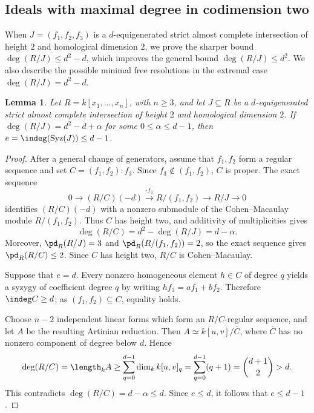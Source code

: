 \documentclass[11pt]{amsart} %
\newtheorem{Lemma}[Theorem]{Lemma}
\theoremstyle{definition}
\def\syz{\mbox{\rm Syz}}
\begin{document}
\subsection{Ideals with maximal degree in codimension two}
\label{subsec:ideals-max-degree}

When $J=(f_1,f_2,f_3)$ is a $d$-equigenerated strict almost complete intersection of height $2$ and homological dimension $2$, we prove the sharper bound $\deg(R/J)\le d^2-d$, which improves the general bound $\deg(R/J)\le d^2$. We also describe the possible minimal free resolutions in the extremal case $\deg(R/J)=d^2-d$.

\begin{Lemma}\label{upperboundinitialdegree}
Let $R=k[x_1,\ldots,x_n]$, with $n\ge3$, and let $J\subseteq R$ be a $d$-equigenerated strict almost complete intersection of height $2$ and homological dimension $2$. If $\deg(R/J)=d^2-d+\alpha$ for some $0\le\alpha\le d-1$, then $e=\indeg(\syz(J))\le d-1$.
\end{Lemma}

\begin{proof}
After a general change of generators, assume that $f_1,f_2$ form a
regular sequence and set $C=(f_1,f_2):f_3$. Since $f_3\notin(f_1,f_2)$,
$C$ is proper. The exact sequence
\begin{equation}\label{seqofthemappingcone}
0\to (R/C)(-d)\xrightarrow{\cdot f_3}R/(f_1,f_2)
\to R/J\to0
\end{equation}
identifies $(R/C)(-d)$ with a nonzero submodule of the
Cohen--Macaulay module $R/(f_1,f_2)$. Thus $C$ has height two, and
additivity of multiplicities gives
\[
\deg(R/C)=d^2-\deg(R/J)=d-\alpha.
\]
Moreover, $\pd_R(R/J)=3$ and $\pd_R(R/(f_1,f_2))=2$, so the
exact sequence gives $\pd_R(R/C)\le2$. Since $C$ has height two,
$R/C$ is Cohen--Macaulay.

Suppose that $e=d$. Every nonzero homogeneous element $h\in C$ of
degree $q$ yields a syzygy of coefficient degree $q$ by writing
$hf_3=af_1+bf_2$. Therefore $\indeg C\ge d$; as
$(f_1,f_2)\subseteq C$, equality holds.

Choose $n-2$ independent linear forms which form an $R/C$-regular
sequence, and let $A$ be the resulting Artinian reduction. Then
$A\simeq k[u,v]/\overline C$, where $\overline C$ has no nonzero
component of degree below $d$. Hence
\[
\deg(R/C)=\length_k A
\ge\sum_{q=0}^{d-1}\dim_k k[u,v]_q
=\sum_{q=0}^{d-1}(q+1)
=\binom{d+1}{2}>d.
\]
This contradicts $\deg(R/C)=d-\alpha\le d$. Since $e\le d$,
it follows that $e\le d-1$.
\end{proof}
\end{document}
